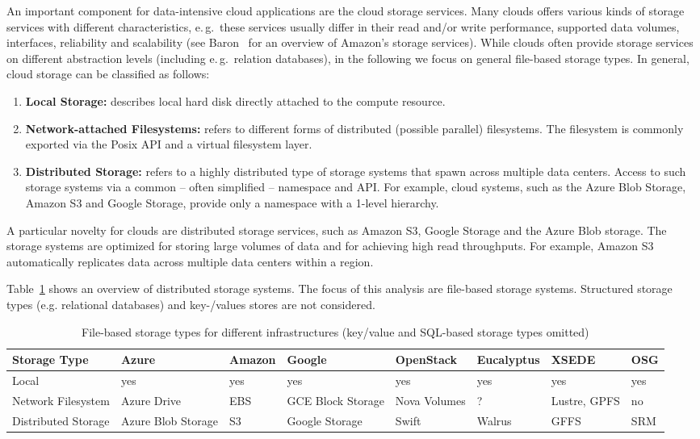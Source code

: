 \documentclass[times]{cpeauth}
\begin{document}
An important component for data-intensive cloud applications are the cloud
storage services. Many clouds offers various kinds of storage services with
different characteristics, e.\,g.\ these services usually differ in their read
and/or write performance, supported data volumes, interfaces, reliability and
scalability (see Baron~\cite{baron2010} for an overview of Amazon's storage
services). While clouds often provide storage services on different 
abstraction levels (including e.\,g.\ relation databases), in the following we 
focus on general file-based storage types. In general, cloud storage can be 
classified as follows:
\begin{enumerate}
	\item \textbf{Local Storage:} describes local hard disk directly attached 
	to the compute resource.
	\item \textbf{Network-attached Filesystems:} refers to different forms of 
	distributed (possible parallel) filesystems. The filesystem is commonly 
	exported via the Posix API and a virtual filesystem layer.
	\item \textbf{Distributed Storage:} refers to a highly distributed type of 
	storage systems that spawn across multiple data centers. Access to such 
	storage systems via a common -- often simplified -- namespace and API. For 
	example, cloud systems, such as the Azure Blob Storage, Amazon S3 and 
	Google Storage, provide only a namespace with a 1-level hierarchy. 
\end{enumerate}

A particular novelty for clouds are distributed storage services, such as
Amazon S3, Google Storage and the Azure Blob storage. The storage systems are
optimized for storing large volumes of data and for achieving high
read throughputs. For example, Amazon S3 automatically replicates data across 
multiple data centers within a region. 


Table~\ref{tab:storage-systems} shows an overview of distributed storage 
systems. The focus of this analysis are file-based storage systems. Structured
storage types (e.g. relational databases) and key-/values stores are not 
considered.

\begin{table}[t]
\centering
\begin{tabular}{|p{1.7cm}|p{1.3cm}|p{1.3cm}|p{1.3cm}|p{1.4cm}|p{1.4cm}|p{1.3cm}|p{1.2cm}|}
	\hline
	\textbf{Storage Type} &\textbf{Azure} &\textbf{Amazon} &\textbf{Google} &\textbf{Open\-Stack} &\textbf{Euca\-lyptus} &\textbf{XSEDE}  &\textbf{OSG} \\
	\hline
	Local	&yes &yes &yes &yes &yes &yes &yes\\
	\hline
	Network Filesystem &Azure Drive &EBS &GCE Block Storage &Nova Volumes &? &Lustre, GPFS 
	&no\\
	\hline
	Distributed Storage &Azure Blob Storage &S3 &Google Storage &Swift & Walrus &GFFS
	 &SRM\\
	\hline	
\end{tabular}
\caption{File-based storage types for different infrastructures (key/value and 
SQL-based storage types omitted) \label{tab:storage-systems}}
\end{table}
\end{document}
